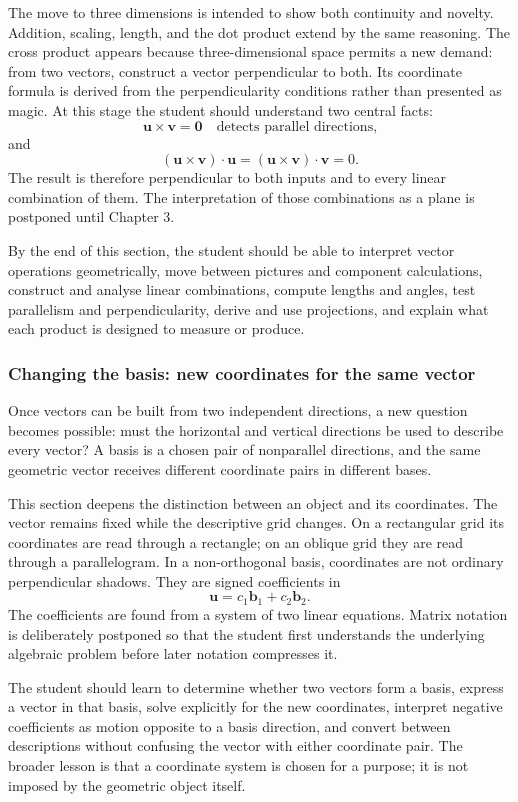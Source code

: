 The move to three dimensions is intended to show both continuity and novelty.
Addition, scaling, length, and the dot product extend by the same reasoning. The
cross product appears because three-dimensional space permits a new demand: from
two vectors, construct a vector perpendicular to both. Its coordinate formula is
derived from the perpendicularity conditions rather than presented as magic. At
this stage the student should understand two central facts:
\[
\mathbf u\times\mathbf v=\mathbf0
\quad\text{detects parallel directions,}
\]
and
\[
(\mathbf u\times\mathbf v)\cdot\mathbf u
=
(\mathbf u\times\mathbf v)\cdot\mathbf v=0.
\]
The result is therefore perpendicular to both inputs and to every linear
combination of them. The interpretation of those combinations as a plane is
postponed until Chapter 3.

By the end of this section, the student should be able to interpret vector
operations geometrically, move between pictures and component calculations,
construct and analyse linear combinations, compute lengths and angles, test
parallelism and perpendicularity, derive and use projections, and explain what
each product is designed to measure or produce.

\subsubsection*{Changing the basis: new coordinates for the same vector}

Once vectors can be built from two independent directions, a new question becomes
possible: must the horizontal and vertical directions be used to describe every
vector? A basis is a chosen pair of nonparallel directions, and the same geometric
vector receives different coordinate pairs in different bases.

This section deepens the distinction between an object and its coordinates. The
vector remains fixed while the descriptive grid changes. On a rectangular grid
its coordinates are read through a rectangle; on an oblique grid they are read
through a parallelogram. In a non-orthogonal basis, coordinates are not ordinary
perpendicular shadows. They are signed coefficients in
\[
\mathbf u=c_1\mathbf b_1+c_2\mathbf b_2.
\]
The coefficients are found from a system of two linear equations. Matrix notation
is deliberately postponed so that the student first understands the underlying
algebraic problem before later notation compresses it.

The student should learn to determine whether two vectors form a basis, express a
vector in that basis, solve explicitly for the new coordinates, interpret
negative coefficients as motion opposite to a basis direction, and convert
between descriptions without confusing the vector with either coordinate pair.
The broader lesson is that a coordinate system is chosen for a purpose; it is not
imposed by the geometric object itself.

